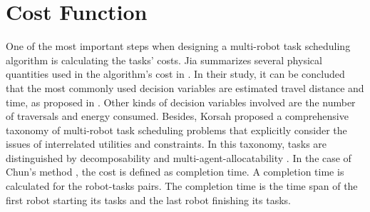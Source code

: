 \section{Cost Function}
\label{sec:cost_function}
One of the most important steps when designing a multi-robot task scheduling algorithm is calculating the tasks' costs. Jia summarizes several physical quantities used in the algorithm's cost in \cite{Jia2013ASA}. In their study, it can be concluded that the most commonly used decision variables are estimated travel distance and time, as proposed in \cite{Dong2015}. Other kinds of decision variables involved are the number of traversals and energy consumed. 
Besides, Korsah proposed a comprehensive taxonomy of multi-robot task scheduling problems that explicitly consider the issues of interrelated utilities and constraints. In this taxonomy, tasks are distinguished by decomposability and multi-agent-allocatability \cite{Korsah13}.
In the case of Chun's method \cite{Chun12}, the cost is defined as completion time. A completion time is calculated for the robot-tasks pairs. The completion time is the time span of the first robot starting its tasks and the last robot finishing its tasks.

